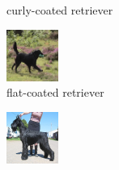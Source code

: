 \documentclass[10pt,twocolumn,letterpaper]{article}
\begin{document}
\begin{figure}
\begin{subfigure}[t]{0.3\linewidth}
    \caption*{curly-coated retriever}
    \end{subfigure}
    \begin{subfigure}[t]{0.3\linewidth}\centering
        \includegraphics[width=\textwidth]{images/205.png}
        \caption*{flat-coated retriever}
    \end{subfigure}
    \begin{subfigure}[t]{0.3\linewidth}\centering
        \includegraphics[width=\textwidth]{images/197.png}

\end{subfigure}
\end{figure}
\end{document}
